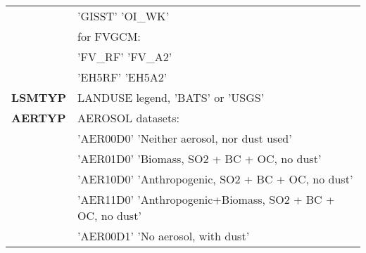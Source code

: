 \begin{table}[h]
\begin{center}
\begin{tabular}{|l|l|}
 &  \vspace{-0.15 cm} \hspace{0.5 cm} {\footnotesize 'GISST'} \hspace{0.5 cm} {\footnotesize 'OI\_WK'}\\ 
 &  \vspace{-0.15 cm} \hspace{0.5 cm} {\footnotesize for FVGCM:}\\
 &  \vspace{-0.15 cm} \hspace{0.5 cm} {\footnotesize 'FV\_RF'}  \hspace{0.5 cm} {\footnotesize 'FV\_A2'}\\
 &  \vspace{-0.15 cm} \hspace{0.5 cm} {\footnotesize 'EH5RF'}  \hspace{0.5 cm} {\footnotesize 'EH5A2'}\\
{\footnotesize {\bf LSMTYP}} & {\footnotesize LANDUSE legend, 'BATS' or 'USGS'} \\ \hline
{\footnotesize {\bf AERTYP}} & {\footnotesize AEROSOL datasets:}\\
 &  \vspace{-0.15 cm} \hspace{0.5 cm} {\footnotesize 'AER00D0'} \hspace{0.5 cm} {\footnotesize 'Neither aerosol, nor dust used'}\\
 &  \vspace{-0.15 cm} \hspace{0.5 cm} {\footnotesize 'AER01D0'} \hspace{0.5 cm} {\footnotesize 'Biomass, SO2 + BC + OC, no dust'}\\ 
 &  \vspace{-0.15 cm} \hspace{0.5 cm} {\footnotesize 'AER10D0'} \hspace{0.5 cm} {\footnotesize 'Anthropogenic, SO2 + BC + OC, no dust'}\\
 &  \vspace{-0.15 cm} \hspace{0.5 cm} {\footnotesize 'AER11D0'} \hspace{0.5 cm} {\footnotesize 'Anthropogenic+Biomass, SO2 + BC + OC, no dust'}\\
 &  \vspace{-0.15 cm} \hspace{0.5 cm} {\footnotesize 'AER00D1'} \hspace{0.5 cm} {\footnotesize 'No aerosol, with dust'}\\

\end{tabular}
\end{center}
\end{table}
